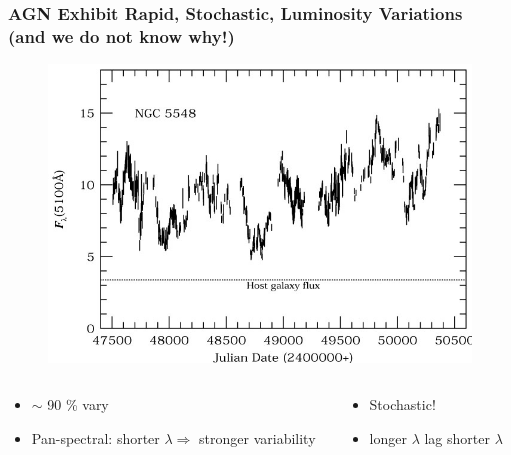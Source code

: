 \documentclass[hyperref={pdfpagelabels=false}]{beamer}
\begin{document}
\begin{frame}
\frametitle{AGN Exhibit Rapid, Stochastic, Luminosity Variations\\(and we do not know why!)}
  \begin{figure}
    \includegraphics[scale=0.25]{images/NGC5548_Variability.jpg}
  \end{figure}
  \centering
    {\tiny \citep{Peterson99}}
  \begin{columns}
  \centering
    \begin{column}{0.5\textwidth}
      \begin{itemize}
        \item $\sim$ 90 \% vary {\tiny \citep{Sesar07}}
        \item Pan-spectral: shorter $\lambda \Rightarrow$ stronger variability
      \end{itemize}
    \end{column}
    \begin{column}{0.5\textwidth}
      \begin{itemize}
        \item Stochastic! {\tiny \citep{Peterson}}
        \item longer $\lambda$ lag shorter $\lambda$
      \end{itemize}
    \end{column}
  \end{columns}
\end{frame}
\end{document}
